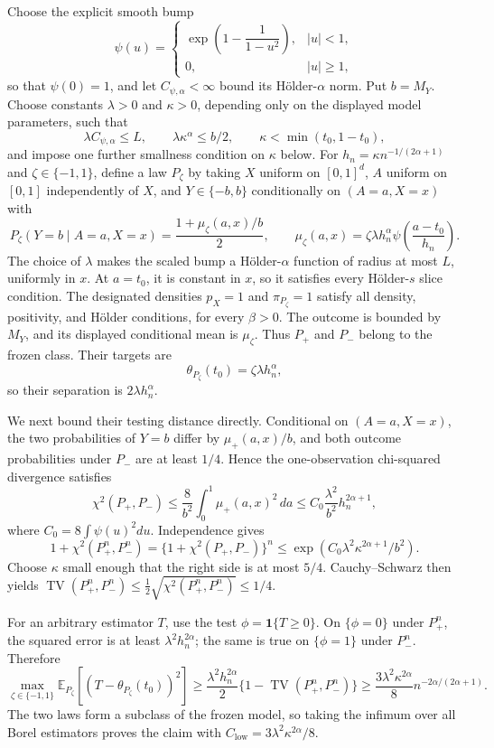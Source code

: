 Choose the explicit smooth bump \[\psi(u)=\begin{cases}\exp\!\left(1-\dfrac{1}{1-u^2}\right),&\lvert u\rvert<1,\\0,&\lvert u\rvert\ge1,\end{cases}\] so that \(\psi(0)=1\), and let \(C_{\psi,\alpha}<\infty\) bound its Hölder-\(\alpha\) norm. Put \(b=M_Y\). Choose constants \(\lambda>0\) and \(\kappa>0\), depending only on the displayed model parameters, such that \[\lambda C_{\psi,\alpha}\le L,\qquad \lambda\kappa^{\alpha}\le b/2,\qquad \kappa<\min(t_0,1-t_0),\] and impose one further smallness condition on \(\kappa\) below. For \(h_n=\kappa n^{-1/(2\alpha+1)}\) and \(\zeta\in\{-1,1\}\), define a law \(P_{\zeta}\) by taking \(X\) uniform on \([0,1]^d\), \(A\) uniform on \([0,1]\) independently of \(X\), and \(Y\in\{-b,b\}\) conditionally on \((A=a,X=x)\) with \[P_{\zeta}(Y=b\mid A=a,X=x)=\frac{1+\mu_{\zeta}(a,x)/b}{2},\qquad \mu_{\zeta}(a,x)=\zeta\lambda h_n^{\alpha}\psi\!\left(\frac{a-t_0}{h_n}\right).\] The choice of \(\lambda\) makes the scaled bump a Hölder-\(\alpha\) function of radius at most \(L\), uniformly in \(x\). At \(a=t_0\), it is constant in \(x\), so it satisfies every Hölder-\(s\) slice condition. The designated densities \(p_X=1\) and \(\pi_{P_{\zeta}}=1\) satisfy all density, positivity, and Hölder conditions, for every \(\beta>0\). The outcome is bounded by \(M_Y\), and its displayed conditional mean is \(\mu_{\zeta}\). Thus \(P_{+}\) and \(P_{-}\) belong to the frozen class. Their targets are \[\theta_{P_{\zeta}}(t_0)=\zeta\lambda h_n^{\alpha},\] so their separation is \(2\lambda h_n^{\alpha}\).

We next bound their testing distance directly. Conditional on \((A=a,X=x)\), the two probabilities of \(Y=b\) differ by \(\mu_{+}(a,x)/b\), and both outcome probabilities under \(P_-\) are at least \(1/4\). Hence the one-observation chi-squared divergence satisfies \[\chi^2(P_+,P_-)\le \frac{8}{b^2}\int_0^1\mu_+(a,x)^2\,da\le C_0\frac{\lambda^2}{b^2}h_n^{2\alpha+1},\] where \(C_0=8\int\psi(u)^2du\). Independence gives \[1+\chi^2(P_+^n,P_-^n)=\{1+\chi^2(P_+,P_-)\}^n\le\exp\!\left(C_0\lambda^2\kappa^{2\alpha+1}/b^2\right).\] Choose \(\kappa\) small enough that the right side is at most \(5/4\). Cauchy--Schwarz then yields \(\operatorname{TV}(P_+^n,P_-^n)\le\tfrac12\sqrt{\chi^2(P_+^n,P_-^n)}\le1/4\).

For an arbitrary estimator \(T\), use the test \(\phi=\mathbf 1\{T\ge0\}\). On \(\{\phi=0\}\) under \(P_+^n\), the squared error is at least \(\lambda^2h_n^{2\alpha}\); the same is true on \(\{\phi=1\}\) under \(P_-^n\). Therefore \[\max_{\zeta\in\{-1,1\}}\mathbb E_{P_{\zeta}}[(T-\theta_{P_{\zeta}}(t_0))^2]\ge\frac{\lambda^2h_n^{2\alpha}}{2}\{1-\operatorname{TV}(P_+^n,P_-^n)\}\ge\frac{3\lambda^2\kappa^{2\alpha}}{8}n^{-2\alpha/(2\alpha+1)}.\] The two laws form a subclass of the frozen model, so taking the infimum over all Borel estimators proves the claim with \(C_{\mathrm{low}}=3\lambda^2\kappa^{2\alpha}/8\).